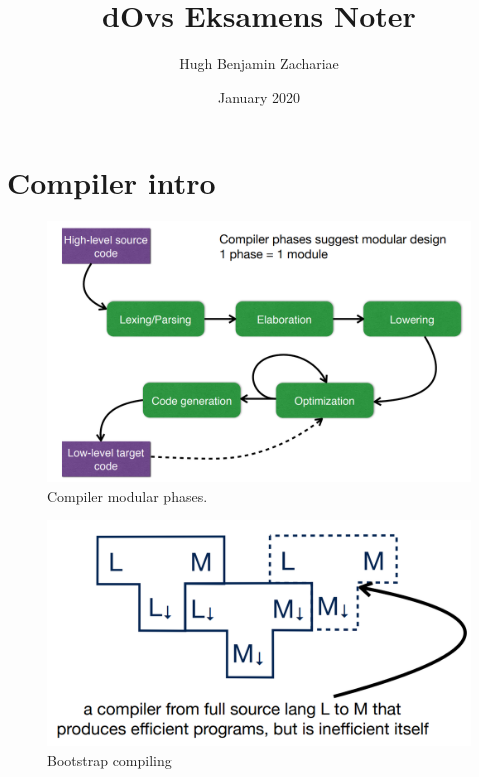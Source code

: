 \documentclass{article}
\title{dOvs Eksamens Noter}
\author{Hugh Benjamin Zachariae}
\date{January 2020}
\begin{document}
\maketitle

\tableofcontents

\newpage

\section{Compiler intro}

\begin{figure}[h]
    \centering
    \includegraphics[scale=0.4]{assets/phases.png}
    \caption{Compiler modular phases.}
    \label{fig:phase}
\end{figure}

\begin{figure}[h]
    \centering
    \includegraphics[scale=0.4]{assets/bootstrap_compile.png}
    \caption{Bootstrap compiling}
    \label{fig:bootstrap}
\end{figure}
\end{document}
